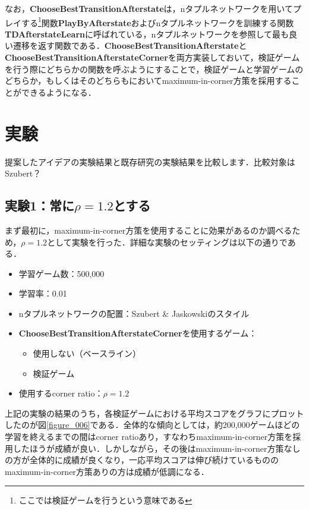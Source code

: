 \documentclass{suribt}
\begin{document}
なお，\textbf{ChooseBestTransitionAfterstate}は，nタプルネットワークを用いてプレイする\footnote{ここでは検証ゲームを行うという意味である}関数\textbf{PlayByAfterstate}およびnタプルネットワークを訓練する関数\textbf{TDAfterstateLearn}に呼ばれている，nタプルネットワークを参照して最も良い遷移を返す関数である．\textbf{ChooseBestTransitionAfterstate}と\textbf{ChooseBestTransitionAfterstateCorner}を両方実装しておいて，検証ゲームを行う際にどちらかの関数を呼ぶようにすることで，検証ゲームと学習ゲームのどちらか，もしくはそのどちらもにおいてmaximum-in-corner方策を採用することができるようになる．

\chapter{実験}
提案したアイデアの実験結果と既存研究の実験結果を比較します．比較対象はSzubert？

\section{実験1：常に${\rho}=1.2$とする}
まず最初に，maximum-in-corner方策を使用することに効果があるのか調べるため，${\rho}=1.2$として実験を行った．詳細な実験のセッティングは以下の通りである．

\begin{itemize}
\item 学習ゲーム数：500,000
\item 学習率：0.01
\item nタプルネットワークの配置：Szubert \& Jaskowskiのスタイル
\item \textbf{ChooseBestTransitionAfterstateCorner}を使用するゲーム：
\begin{itemize}
\item 使用しない（ベースライン）
\item 検証ゲーム
\end{itemize}
\item 使用するcorner ratio：${\rho}=1.2$
\end{itemize}

上記の実験の結果のうち，各検証ゲームにおける平均スコアをグラフにプロットしたのが図\ref{figure_006}である．全体的な傾向としては，約200,000ゲームほどの学習を終えるまでの間はcorner ratioあり，すなわちmaximum-in-corner方策を採用したほうが成績が良い．しかしながら，その後はmaximum-in-corner方策なしの方が全体的に成績が良くなり，一応平均スコアは伸び続けているもののmaximum-in-corner方策ありの方は成績が低調になる．
\end{document}
